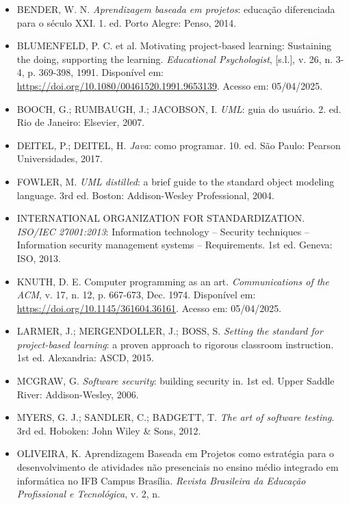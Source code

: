 \documentclass[12pt,a4paper]{article}
\begin{document}
\begin{itemize}[leftmargin=1.2cm]
    \item BENDER, W. N. \textit{Aprendizagem baseada em projetos}: educação diferenciada para o
        século XXI. 1. ed. Porto Alegre: Penso, 2014.
    \item BLUMENFELD, P. C. et al. Motivating project-based learning: Sustaining the doing,
        supporting the learning. \textit{Educational Psychologist}, [s.l.], v. 26, n. 3-4, p.
        369-398, 1991. Disponível em: \url{https://doi.org/10.1080/00461520.1991.9653139}.
        Acesso em: 05/04/2025.
    \item BOOCH, G.; RUMBAUGH, J.; JACOBSON, I. \textit{UML}: guia do usuário. 2. ed. Rio de
        Janeiro: Elsevier, 2007.
    \item DEITEL, P.; DEITEL, H. \textit{Java\textregistered{}}: como programar. 10. ed. São
        Paulo: Pearson Universidades, 2017.
    \item FOWLER, M. \textit{UML distilled}: a brief guide to the standard object modeling
        language. 3rd ed. Boston: Addison-Wesley Professional, 2004.
    \item INTERNATIONAL ORGANIZATION FOR STANDARDIZATION. \textit{ISO/IEC 27001:2013}:
        Information technology -- Security techniques -- Information security management
        systems -- Requirements. 1st ed. Geneva: ISO, 2013.
    \item KNUTH, D. E. Computer programming as an art. \textit{Communications of the ACM}, v.
        17, n. 12, p. 667-673, Dec. 1974. Disponível em:
        \url{https://doi.org/10.1145/361604.36161}. Acesso em: 05/04/2025.
    \item LARMER, J.; MERGENDOLLER, J.; BOSS, S. \textit{Setting the standard for project-based
        learning}: a proven approach to rigorous classroom instruction. 1st ed. Alexandria:
        ASCD, 2015.
    \item MCGRAW, G. \textit{Software security}: building security in. 1st ed. Upper Saddle
        River: Addison-Wesley, 2006.
    \item MYERS, G. J.; SANDLER, C.; BADGETT, T. \textit{The art of software testing}. 3rd ed.
        Hoboken: John Wiley \& Sons, 2012.
    \item OLIVEIRA, K. Aprendizagem Baseada em Projetos como estratégia para o desenvolvimento de
        atividades não presenciais no ensino médio integrado em informática no IFB Campus
        Brasília. \textit{Revista Brasileira da Educação Profissional e Tecnológica}, v. 2, n.

\end{itemize}
\end{document}

